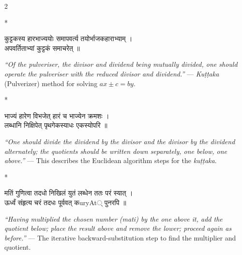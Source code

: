 \documentclass[11pt,a4paper]{article}
\newcommand{\dev}[1]{{\devanagarifont #1}}
\theoremstyle{definition}
\begin{document}
\begin{paracol}{2}

\switchcolumn[0]*\noindent
\begin{tcolorbox}[colback=sktbg,colframe=vertrule,boxrule=0.5pt,arc=3pt,title={\small\bfseries\color{titlecolor} Sanskrit Text},fonttitle=\devanagarifont]
\dev{कुट्टकस्य हारभाज्ययोः समापवर्त्य तयोर्भाजकहाराभ्याम् ।\\
अपवर्तिताभ्यां कुट्टकं समाचरेत् ॥}
\end{tcolorbox}

\switchcolumn\noindent
\begin{tcolorbox}[colback=transbg,colframe=vertrule!60,boxrule=0.5pt,arc=3pt,title={\small\bfseries English Translation}]
\textit{``Of the pulveriser, the divisor and dividend being mutually divided, one should operate the pulveriser with the reduced divisor and dividend.''} --- \textit{Ku\d{t}\d{t}aka} (Pulverizer) method for solving $ax \pm c = by$.
\end{tcolorbox}

\switchcolumn[0]*\noindent
\begin{tcolorbox}[colback=sktbg,colframe=vertrule,boxrule=0.5pt,arc=3pt]
\dev{भाज्यं हारेण विभजेत् हारं च भाज्येन क्रमशः ।\\
लब्धानि निक्षिपेत् पृथगेकस्याधः एकस्योपरि ॥}
\end{tcolorbox}

\switchcolumn\noindent
\begin{tcolorbox}[colback=transbg,colframe=vertrule!60,boxrule=0.5pt,arc=3pt]
\textit{``One should divide the dividend by the divisor and the divisor by the dividend alternately; the quotients should be written down separately, one below, one above.''} --- This describes the Euclidean algorithm steps for the \textit{ku\d{t}\d{t}aka}.
\end{tcolorbox}

\switchcolumn[0]*\noindent
\begin{tcolorbox}[colback=sktbg,colframe=vertrule,boxrule=0.5pt,arc=3pt]
\dev{मतिं गुणित्वा तदधो निखिलं युतं लब्धेन ततः परं स्यात् ।\\
ऊर्ध्वं संहृत्य चरं तदधः पूर्ववत् कuryAt् पुनरपि ॥}
\end{tcolorbox}

\switchcolumn\noindent
\begin{tcolorbox}[colback=transbg,colframe=vertrule!60,boxrule=0.5pt,arc=3pt]
\textit{``Having multiplied the chosen number (mati) by the one above it, add the quotient below; place the result above and remove the lower; proceed again as before.''} --- The iterative backward-substitution step to find the multiplier and quotient.
\end{tcolorbox}


\end{paracol}
\end{document}
